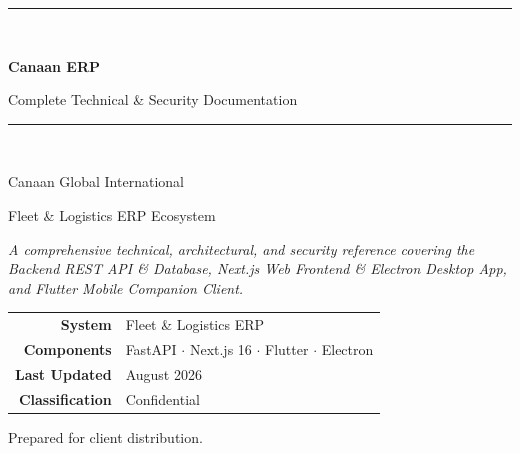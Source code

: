 \documentclass[11pt,a4paper]{article}
\begin{document}
\begin{titlepage}
  \centering
  \vspace*{1.5cm}
  {\color{canaanprimary}\rule{\textwidth}{2pt}}\\[0.6cm]
  {\sffamily\Huge\bfseries\color{canaanprimary} Canaan ERP\par}
  \vspace{0.3cm}
  {\sffamily\Large\color{canaandark} Complete Technical \& Security Documentation\par}
  \vspace{0.4cm}
  {\color{canaanprimary}\rule{\textwidth}{2pt}}\\[1.2cm]

  {\sffamily\large\color{canaanaccent} Canaan Global International\par}
  {\sffamily\normalsize\color{canaandark} Fleet \& Logistics ERP Ecosystem\par}
  \vspace{1.0cm}

  \begin{minipage}{0.85\textwidth}
    \centering\itshape\color{canaandark}
    A comprehensive technical, architectural, and security reference covering
    the Backend REST API \& Database, Next.js Web Frontend \& Electron Desktop
    App, and Flutter Mobile Companion Client.
  \end{minipage}

  \vfill

  \begin{tabular}{rl}
    \textbf{\color{canaanprimary}System} & Fleet \& Logistics ERP \\
    \textbf{\color{canaanprimary}Components} & FastAPI $\cdot$ Next.js 16 $\cdot$ Flutter $\cdot$ Electron \\
    \textbf{\color{canaanprimary}Last Updated} & August 2026 \\
    \textbf{\color{canaanprimary}Classification} & Confidential \\
  \end{tabular}

  \vspace{1.2cm}
  {\footnotesize\color{codecomment} Prepared for client distribution.}
\end{titlepage}

\end{document}
